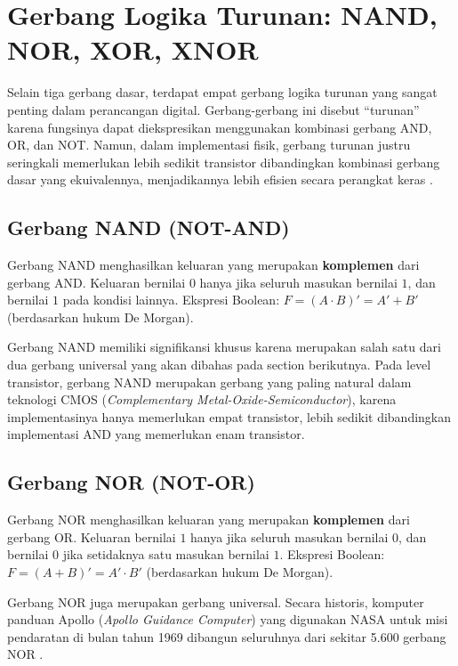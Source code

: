 \section{Gerbang Logika Turunan: NAND, NOR, XOR, XNOR}

Selain tiga gerbang dasar, terdapat empat gerbang logika turunan yang sangat penting dalam perancangan digital. Gerbang-gerbang ini disebut ``turunan'' karena fungsinya dapat diekspresikan menggunakan kombinasi gerbang AND, OR, dan NOT. Namun, dalam implementasi fisik, gerbang turunan justru seringkali memerlukan lebih sedikit transistor dibandingkan kombinasi gerbang dasar yang ekuivalennya, menjadikannya lebih efisien secara perangkat keras \cite{allaboutcircuits_gates}.

\subsection{Gerbang NAND (NOT-AND)}

\begin{definisi}
Gerbang NAND menghasilkan keluaran yang merupakan \textbf{komplemen} dari gerbang AND. Keluaran bernilai $0$ hanya jika seluruh masukan bernilai $1$, dan bernilai $1$ pada kondisi lainnya. Ekspresi Boolean: $F = (A \cdot B)' = A' + B'$ (berdasarkan hukum De Morgan).
\end{definisi}

Gerbang NAND memiliki signifikansi khusus karena merupakan salah satu dari dua gerbang universal yang akan dibahas pada section berikutnya. Pada level transistor, gerbang NAND merupakan gerbang yang paling natural dalam teknologi CMOS (\textit{Complementary Metal-Oxide-Semiconductor}), karena implementasinya hanya memerlukan empat transistor, lebih sedikit dibandingkan implementasi AND yang memerlukan enam transistor.

\subsection{Gerbang NOR (NOT-OR)}

\begin{definisi}
Gerbang NOR menghasilkan keluaran yang merupakan \textbf{komplemen} dari gerbang OR. Keluaran bernilai $1$ hanya jika seluruh masukan bernilai $0$, dan bernilai $0$ jika setidaknya satu masukan bernilai $1$. Ekspresi Boolean: $F = (A + B)' = A' \cdot B'$ (berdasarkan hukum De Morgan).
\end{definisi}

Gerbang NOR juga merupakan gerbang universal. Secara historis, komputer panduan Apollo (\textit{Apollo Guidance Computer}) yang digunakan NASA untuk misi pendaratan di bulan tahun 1969 dibangun seluruhnya dari sekitar 5.600 gerbang NOR \cite{electronics_tutorials_gates}.

